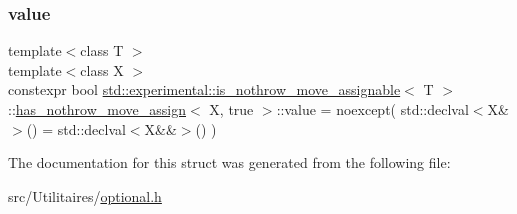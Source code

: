 \subsubsection{\texorpdfstring{value}{value}}
{\footnotesize\ttfamily template$<$class T $>$ \\
template$<$class X $>$ \\
constexpr bool \mbox{\hyperlink{structstd_1_1experimental_1_1is__nothrow__move__assignable}{std\+::experimental\+::is\+\_\+nothrow\+\_\+move\+\_\+assignable}}$<$ T $>$\+::\mbox{\hyperlink{structstd_1_1experimental_1_1is__nothrow__move__assignable_1_1has__nothrow__move__assign}{has\+\_\+nothrow\+\_\+move\+\_\+assign}}$<$ X, true $>$\+::value = noexcept( std\+::declval$<$X\&$>$() = std\+::declval$<$X\&\&$>$() )\hspace{0.3cm}{\ttfamily [static]}}



The documentation for this struct was generated from the following file\+:\begin{DoxyCompactItemize}
\item 
src/\+Utilitaires/\mbox{\hyperlink{optional_8h}{optional.\+h}}\end{DoxyCompactItemize}
